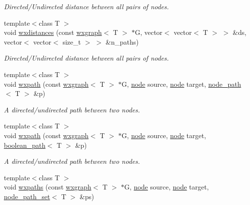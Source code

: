 \begin{DoxyCompactItemize}
\begin{DoxyCompactList}\small\item\em Directed/\+Undirected distance between all pairs of nodes. \end{DoxyCompactList}\item 
{\footnotesize template$<$class T $>$ }\\void \hyperlink{namespacelgraph_1_1traversal_a793eff57b1bb9b9a43fe7de0da68c7c9}{wxdistances} (const \hyperlink{classlgraph_1_1utils_1_1wxgraph}{wxgraph}$<$ T $>$ $\ast$G, vector$<$ vector$<$ T $>$ $>$ \&ds, vector$<$ vector$<$ size\+\_\+t $>$ $>$ \&n\+\_\+paths)
\begin{DoxyCompactList}\small\item\em Directed/\+Undirected distance between all pairs of nodes. \end{DoxyCompactList}\item 
{\footnotesize template$<$class T $>$ }\\void \hyperlink{namespacelgraph_1_1traversal_acb255be04a53f1d3863f7beaeda2dde0}{wxpath} (const \hyperlink{classlgraph_1_1utils_1_1wxgraph}{wxgraph}$<$ T $>$ $\ast$G, \hyperlink{namespacelgraph_1_1utils_a7bd66ede3805ef121bc2835bd48de0cf}{node} source, \hyperlink{namespacelgraph_1_1utils_a7bd66ede3805ef121bc2835bd48de0cf}{node} target, \hyperlink{classlgraph_1_1utils_1_1node__path}{node\+\_\+path}$<$ T $>$ \&p)
\begin{DoxyCompactList}\small\item\em A directed/undirected path between two nodes. \end{DoxyCompactList}\item 
{\footnotesize template$<$class T $>$ }\\void \hyperlink{namespacelgraph_1_1traversal_a2e3286cb7b83c0a47820b1d7256231ab}{wxpath} (const \hyperlink{classlgraph_1_1utils_1_1wxgraph}{wxgraph}$<$ T $>$ $\ast$G, \hyperlink{namespacelgraph_1_1utils_a7bd66ede3805ef121bc2835bd48de0cf}{node} source, \hyperlink{namespacelgraph_1_1utils_a7bd66ede3805ef121bc2835bd48de0cf}{node} target, \hyperlink{classlgraph_1_1utils_1_1boolean__path}{boolean\+\_\+path}$<$ T $>$ \&p)
\begin{DoxyCompactList}\small\item\em A directed/undirected path between two nodes. \end{DoxyCompactList}\item 
{\footnotesize template$<$class T $>$ }\\void \hyperlink{namespacelgraph_1_1traversal_a97b92a041fa93b26f26d60d11f717dc5}{wxpaths} (const \hyperlink{classlgraph_1_1utils_1_1wxgraph}{wxgraph}$<$ T $>$ $\ast$G, \hyperlink{namespacelgraph_1_1utils_a7bd66ede3805ef121bc2835bd48de0cf}{node} source, \hyperlink{namespacelgraph_1_1utils_a7bd66ede3805ef121bc2835bd48de0cf}{node} target, \hyperlink{namespacelgraph_1_1utils_a723c115f9865edfab11a90377b9abef4}{node\+\_\+path\+\_\+set}$<$ T $>$ \&ps)

\end{DoxyCompactItemize}
